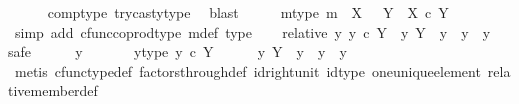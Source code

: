 \begin{isabellebody}
\ \ \ \ \isamarkupfalse%
\ comp{\isacharunderscore}{\kern0pt}type\ trycast{\isacharunderscore}{\kern0pt}y{}{\isacharunderscore}{\kern0pt}type\ \isamarkupfalse%
\ blast\isanewline
\ \ \isamarkupfalse%
\ \isamarkupfalse%
\ m{\isacharunderscore}{\kern0pt}type{\isacharcolon}{\kern0pt}\ {\isachardoublequoteopen}m\ {\isacharcolon}{\kern0pt}\ X\ \ {\isasymCoprod}\ Y\ {\isasymrightarrow}\ {\isacharparenleft}{\kern0pt}X\ {\isasymtimes}\isactrlsub c\ Y{\isacharparenright}{\kern0pt}{\isachardoublequoteclose}\isanewline
\ \ \ \ \isamarkupfalse%
\ {\isacharparenleft}{\kern0pt}simp\ add{\isacharcolon}{\kern0pt}\ cfunc{\isacharunderscore}{\kern0pt}coprod{\isacharunderscore}{\kern0pt}type\ m{\isacharunderscore}{\kern0pt}def\ type{}{\isacharparenright}{\kern0pt}\isanewline
\isanewline
\ \ \isamarkupfalse%
\ relative{\isacharcolon}{\kern0pt}\ {\isachardoublequoteopen}{\isasymAnd}y{\isachardot}{\kern0pt}\ y\ {\isasymin}\isactrlsub c\ Y\ {\isasymLongrightarrow}\ {\isacharparenleft}{\kern0pt}y\ {\isasymin}\isactrlbsub Y\isactrlesub \ {\isacharparenleft}{\kern0pt}{\isasymone}{\isacharcomma}{\kern0pt}\ y{}{\isacharparenright}{\kern0pt}{\isacharparenright}{\kern0pt}\ {\isacharequal}{\kern0pt}\ {\isacharparenleft}{\kern0pt}y\ {\isacharequal}{\kern0pt}\ y{}{\isacharparenright}{\kern0pt}{\isachardoublequoteclose}\isanewline
\ \ \isamarkupfalse%
{\isacharparenleft}{\kern0pt}safe{\isacharparenright}{\kern0pt}\isanewline
\ \ \ \ \isamarkupfalse%
\ y\ \isanewline
\ \ \ \ \isamarkupfalse%
\ y{\isacharunderscore}{\kern0pt}type{\isacharcolon}{\kern0pt}\ {\isachardoublequoteopen}y\ {\isasymin}\isactrlsub c\ Y{\isachardoublequoteclose}\isanewline
\ \ \ \ \isamarkupfalse%
\ {\isachardoublequoteopen}y\ {\isasymin}\isactrlbsub Y\isactrlesub \ {\isacharparenleft}{\kern0pt}{\isasymone}{\isacharcomma}{\kern0pt}\ y{}{\isacharparenright}{\kern0pt}\ {\isasymLongrightarrow}\ y\ {\isacharequal}{\kern0pt}\ y{}{\isachardoublequoteclose}\isanewline
\ \ \ \ \ \ \isamarkupfalse%
\ {\isacharparenleft}{\kern0pt}metis\ cfunc{\isacharunderscore}{\kern0pt}type{\isacharunderscore}{\kern0pt}def\ factors{\isacharunderscore}{\kern0pt}through{\isacharunderscore}{\kern0pt}def\ id{\isacharunderscore}{\kern0pt}right{\isacharunderscore}{\kern0pt}unit{}\ id{\isacharunderscore}{\kern0pt}type\ one{\isacharunderscore}{\kern0pt}unique{\isacharunderscore}{\kern0pt}element\ relative{\isacharunderscore}{\kern0pt}member{\isacharunderscore}{\kern0pt}def{}{\isacharparenright}{\kern0pt}\isanewline

\end{isabellebody}
